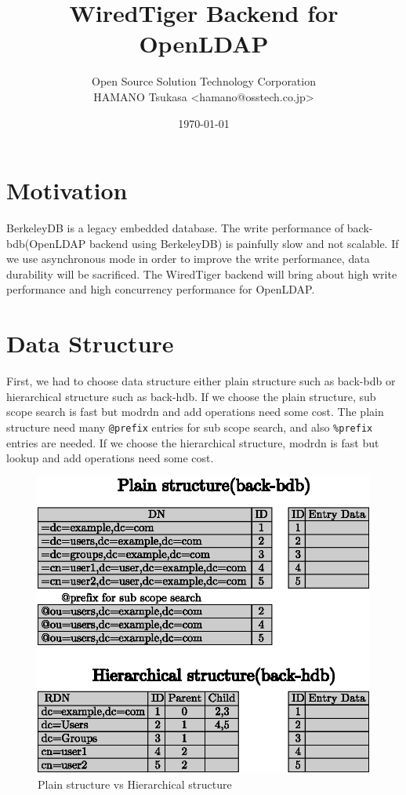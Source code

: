 \documentclass[a4paper
,12
,twocolumn
]{article}
\title{WiredTiger Backend for OpenLDAP}
\author{Open Source Solution Technology Corporation \\ HAMANO Tsukasa \textless{}hamano@osstech.co.jp\textgreater{}}
\date{\today}
\begin{document}
\maketitle
{}
\section{Motivation}\label{motivation}

BerkeleyDB is a legacy embedded database. The write performance of
back-bdb(OpenLDAP backend using BerkeleyDB) is painfully slow and not
scalable. If we use asynchronous mode in order to improve the write
performance, data durability will be sacrificed. The WiredTiger backend
will bring about high write performance and high concurrency performance
for OpenLDAP.

\section{Data Structure}\label{data-structure}

First, we had to choose data structure either plain structure such as
back-bdb or hierarchical structure such as back-hdb. If we choose the
plain structure, sub scope search is fast but modrdn and add operations
need some cost. The plain structure need many \texttt{@prefix} entries
for sub scope search, and also \texttt{\%prefix} entries are needed. If
we choose the hierarchical structure, modrdn is fast but lookup and add
operations need some cost.

\begin{figure}[H]
\centering
\includegraphics[width=0.9\columnwidth]{figure/plain_vs_hierarchical.eps}
\caption{Plain structure vs Hierarchical structure}
\end{figure}
\end{document}
